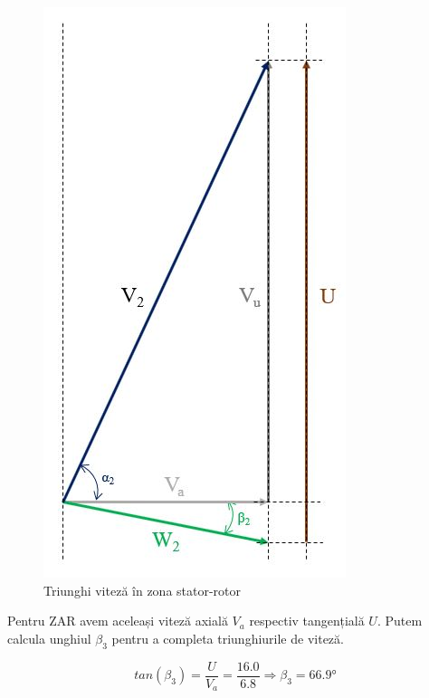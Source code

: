 \begin{figure}[h!]
	\centering
	\includegraphics[scale=0.55]{figures/triunghi_viteza_ZSR.jpg}
	\caption{Triunghi viteză în zona stator-rotor}
	\label{Triunghi viteză în zona stator-rotor}
\end{figure}

\clearpage

Pentru ZAR avem aceleași viteză axială $V_a$ respectiv tangențială $U$. Putem calcula unghiul $\beta_3$ pentru a completa triunghiurile de viteză.

\begin{equation}
tan(\beta_{3})=\frac{U}{V_a} = \frac{16.0}{6.8} \Rightarrow \beta_{3} =66.9\si{\degree}
\end{equation}

